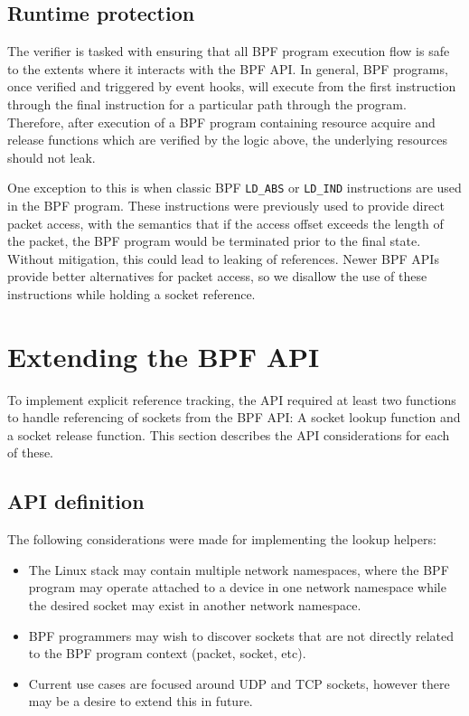 \documentclass[10pt,sigconf,authorversion]{lpc}
\begin{document}
\subsection{Runtime protection}

The verifier is tasked with ensuring that all BPF program execution flow is
safe to the extents where it interacts with the BPF API. In general, BPF
programs, once verified and triggered by event hooks, will execute from the
first instruction through the final instruction for a particular path through
the program. Therefore, after execution of a BPF program containing resource
acquire and release functions which are verified by the logic above, the
underlying resources should not leak.

One exception to this is when classic BPF \verb+LD_ABS+ or \verb+LD_IND+
instructions are used in the BPF program. These instructions were previously
used to provide direct packet access, with the semantics that if the access
offset exceeds the length of the packet, the BPF program would be terminated
prior to the final state. Without mitigation, this could lead to leaking of
references. Newer BPF APIs provide better alternatives for packet access, so we
disallow the use of these instructions while holding a socket reference.

\section{Extending the BPF API}

To implement explicit reference tracking, the API required at least two
functions to handle referencing of sockets from the BPF API: A socket lookup
function and a socket release function. This section describes the API
considerations for each of these.

\subsection{API definition}

The following considerations were made for implementing the lookup helpers:

\begin{itemize}
    \item The Linux stack may contain multiple network namespaces, where the
          BPF program may operate attached to a device in one network namespace
          while the desired socket may exist in another network namespace.
    \item BPF programmers may wish to discover sockets that are not directly
          related to the BPF program context (packet, socket, etc).
    \item Current use cases are focused around UDP and TCP sockets, however
          there may be a desire to extend this in future.
\end{itemize}
\end{document}
